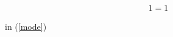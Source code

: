 \documentclass[12pt]{article}
\begin{document}
\begin{align}
  1=1\label{mode}
\end{align}

in (\eqref{mode})
\end{document}
